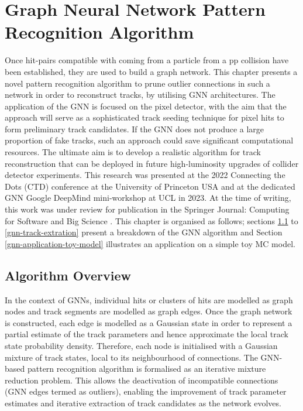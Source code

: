 
\chapter{Graph Neural Network Pattern Recognition Algorithm}\label{chapter-5}

Once hit-pairs compatible with coming from a particle from a pp collision have been established, they are used to build a graph network. This chapter presents a novel pattern recognition algorithm to prune outlier connections in such a network in order to reconstruct tracks, by utilising GNN architectures. The application of the GNN is focused on the pixel detector, with the aim that the approach will serve as a sophisticated track seeding technique for pixel hits to form preliminary track candidates. If the GNN does not produce a large proportion of fake tracks, such an approach could save significant computational resources. The ultimate aim is to develop a realistic algorithm for track reconstruction that can be deployed in future high-luminosity upgrades of collider detector experiments. This research was presented at the 2022 Connecting the Dots (CTD) conference at the University of Princeton USA and at the dedicated GNN Google DeepMind mini-workshop at UCL in 2023. At the time of writing, this work was under review for publication in the Springer Journal: Computing for Software and Big Science \cite{Lad_2023_gnn}. This chapter is organised as follows; sections \ref{gnn-algorithm-overview} to \ref{gnn-track-extration} present a breakdown of the GNN algorithm and Section \ref{gnn-application-toy-model} illustrates an application on a simple toy MC model.


\section{Algorithm Overview}
\label{gnn-algorithm-overview}

In the context of GNNs, individual hits or clusters of hits are modelled as graph nodes and track segments are modelled as graph edges. Once the graph network is constructed, each edge is modelled as a Gaussian state in order to represent a partial estimate of the track parameters and hence approximate the local track state probability density. Therefore, each node is initialised with a Gaussian mixture of track states, local to its neighbourhood of connections. The GNN-based pattern recognition algorithm is formalised as an iterative mixture reduction problem. This allows the deactivation of incompatible connections (GNN edges termed as outliers), enabling the improvement of track parameter estimates and iterative extraction of track candidates as the network evolves. 

